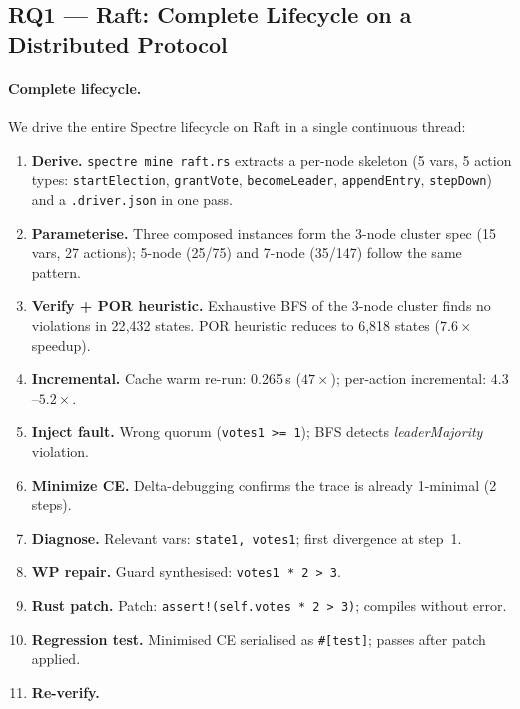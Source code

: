 \documentclass[runningheads]{../paper-vmcai-2027/llncs}
\begin{document}
\subsection{RQ1 --- Raft: Complete Lifecycle on a Distributed Protocol}
\label{sec:eval:raft}

\paragraph{Complete lifecycle.}
We drive the entire Spectre lifecycle on Raft in a single continuous thread:
\begin{enumerate}[leftmargin=1.4em,itemsep=0pt,parsep=0pt]
\item[\textbf{(1)}] \textbf{Derive.}
  \texttt{spectre mine raft.rs} extracts a per-node skeleton
  (5 vars, 5 action types: \texttt{startElection}, \texttt{grantVote},
  \texttt{becomeLeader}, \texttt{appendEntry}, \texttt{stepDown})
  and a \texttt{.driver.json} in one pass.
\item[\textbf{(2)}] \textbf{Parameterise.}
  Three composed instances form the 3-node cluster spec (15 vars, 27 actions);
  5-node (25/75) and 7-node (35/147) follow the same pattern.
\item[\textbf{(3)}] \textbf{Verify + POR heuristic.}
  Exhaustive BFS of the 3-node cluster finds no violations in 22{,}432 states.
  POR heuristic reduces to 6{,}818 states ($7.6\times$ speedup).
\item[\textbf{(4)}] \textbf{Incremental.}
  Cache warm re-run: 0.265\,s ($47\times$); per-action incremental: $4.3$--$5.2\times$.
\item[\textbf{(5)}] \textbf{Inject fault.}
  Wrong quorum (\texttt{votes1 >= 1}); BFS detects \emph{leaderMajority} violation.
\item[\textbf{(6)}] \textbf{Minimize CE.}
  Delta-debugging confirms the trace is already 1-minimal (2 steps).
\item[\textbf{(7)}] \textbf{Diagnose.}
  Relevant vars: \texttt{state1, votes1}; first divergence at step~1.
\item[\textbf{(8)}] \textbf{WP repair.}
  Guard synthesised: \texttt{votes1 * 2 > 3}.
\item[\textbf{(9)}] \textbf{Rust patch.}
  Patch: \texttt{assert!(self.votes * 2 > 3)}; compiles without error.
\item[\textbf{(10)}] \textbf{Regression test.}
  Minimised CE serialised as \texttt{\#[test]}; passes after patch applied.
\item[\textbf{(11)}] \textbf{Re-verify.}

\end{enumerate}
\end{document}
